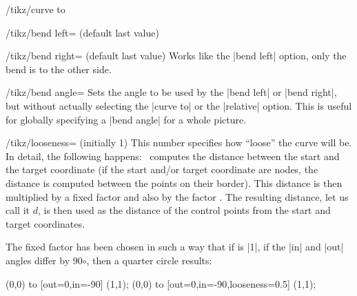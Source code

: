 \begin{key}{/tikz/curve to}
\begin{key}{/tikz/bend left= (default \normalfont last value)}
\begin{codeexample}[preamble={\usetikzlibrary{automata,positioning}}]
\end{codeexample}

\begin{codeexample}[]
\end{codeexample}
    \end{key}

    \begin{key}{/tikz/bend right= (default \normalfont last  value)}
        Works like the |bend left| option, only the bend is to the other side.
    \end{key}

    \begin{key}{/tikz/bend angle=}
        Sets the angle to be used by the |bend left| or |bend right|, but
        without actually selecting the |curve to| or the |relative| option.
        This is useful for globally specifying a |bend angle| for a whole
        picture.
    \end{key}

    \begin{key}{/tikz/looseness= (initially 1)}
        This number specifies how ``loose'' the curve will be. In detail, the
        following happens: \tikzname\ computes the distance between the start
        and the target coordinate (if the start and/or target coordinate are
        nodes, the distance is computed between the points on their border).
        This distance is then multiplied by a fixed factor and also by the
        factor . The resulting distance, let us call it $d$, is
        then used as the distance of the control points from the start and
        target coordinates.

        The fixed factor has been chosen in such a way that if  is
        |1|, if the |in| and |out| angles differ by 90$\circ$, then a quarter
        circle results:
\begin{codeexample}[]
\tikz \draw (0,0) to [out=0,in=-90]               (1,1);
\tikz \draw (0,0) to [out=0,in=-90,looseness=0.5] (1,1);
\end{codeexample}
    \end{key}


\end{key}
